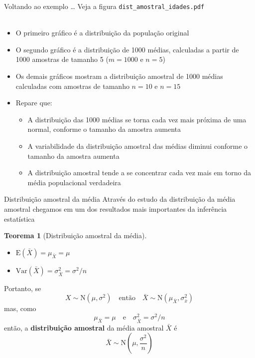 \documentclass[10pt]{beamer}\usepackage[]{graphicx}\usepackage[]{color}
\providecommand{\E}{\text{E}}
\providecommand{\Var}{\text{Var}}
\theoremstyle{definition}
\newtheorem*{mythm}{Teorema}
\begin{document}
\begin{frame}{Voltando ao exemplo \ldots}
Veja a figura \texttt{dist\_amostral\_idades.pdf}\\~\\
\begin{itemize}
\item O primeiro gráfico é a distribuição da população original
\item O segundo gráfico é a distribuição de 1000 médias, calculadas a
  partir de 1000 amostras de tamanho 5 ($m=1000$ e $n=5$)
\item Os demais gráficos mostram a distribuição amostral de 1000 médias
  calculadas com amostras de tamanho $n=10$ e $n=15$
\item Repare que:
  \begin{itemize}
  \item A distribuição das 1000 médias se torna cada vez mais próxima de
    uma normal, conforme o tamanho da amostra aumenta
  \item A variabilidade da distribuição amostral das médias diminui
    conforme o tamanho da amostra aumenta
  \item A distribuição amostral tende a se concentrar cada vez mais em
    torno da média populacional verdadeira
  \end{itemize}
\end{itemize}
\end{frame}

\begin{frame}[fragile=singleslide]{Distribuição amostral da média}
  Através do estudo da distribuição da média amostral chegamos em um dos
  resultados mais importantes da inferência estatística
  \begin{mythm}[Distribuição amostral da média]
    \begin{itemize}
    \item $\E(\bar{X}) = \mu_{\bar{X}} = \mu$
    \item $\Var(\bar{X}) = \sigma^2_{\bar{X}} = \sigma^2/n$
    \end{itemize}
  \end{mythm}
  Portanto, se
  \begin{equation*}
    X \sim \text{N}(\mu, \sigma^2) \quad \text{então} \quad
    \bar{X} \sim \text{N}(\mu_{\bar{X}}, \sigma^2_{\bar{x}})
  \end{equation*}
  mas, como
  \begin{equation*}
    \mu_{\bar{X}} = \mu \quad \text{e} \quad \sigma^2_{\bar{X}} = \sigma^2/n
  \end{equation*}
  então, a \textbf{distribuição amostral} da média amostral $\bar{X}$ é
  \begin{equation*}
    \bar{X} \sim \text{N}\left(\mu, \frac{\sigma^2}{n} \right)
  \end{equation*}
\end{frame}
\end{document}
